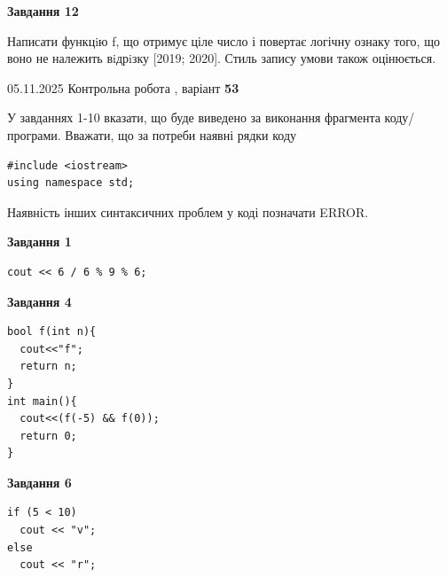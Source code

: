 \documentclass[12pt, ukrainian]{article}
\begin{document}
{\begin {large}
\begin{minipage}[t]{11.0cm}
\begin{center}
\textbf{Завдання 12}
\end{center}

Написати функцiю f, що отримує ціле число і повертає логічну ознаку того, що воно не належить вiдрiзку [2019; 2020]. Стиль запису умови також оцінюється.\par

\end{minipage}

\end {large}}
\newpage

{\Large{05.11.2025 Контрольна робота , варіант  \No \textbf { 53 }\par}}
{
\begin {large}
У завданнях 1-10 вказати, що буде виведено за виконання фрагмента коду/про\-гра\-ми.
Вважати, що за потреби наявні рядки коду
\begin{verbatim}
#include <iostream>
using namespace std;
\end{verbatim}
Наявність інших синтаксичних проблем у коді позначати ERROR.

\begin{minipage}[t]{7.0cm}

\begin{center}
\textbf{Завдання 1}
\end{center}
\vspace{-8mm}

\begin{verbatim}
cout << 6 / 6 % 9 % 6;
\end{verbatim}



\begin{center}
\textbf{Завдання 4}
\end{center}
\vspace{-8mm}

\begin{verbatim}
bool f(int n){
  cout<<"f";
  return n;
}
int main(){
  cout<<(f(-5) && f(0));
  return 0;
}
\end{verbatim}



\begin{center}
\textbf{Завдання 6}
\end{center}
\vspace{-8mm}

\begin{verbatim}
if (5 < 10)
  cout << "v";
else
  cout << "r";
\end{verbatim}




\end{minipage}
\end{large}}
\end{document}
